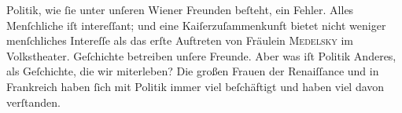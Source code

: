                Politik, wie ſie unter unſeren Wiener Freunden
               beſteht, ein Fehler. Alles Menſchliche iſt intereſſant; und \strikeout{\textcolor{gray}{poli}} eine Kaiſerzuſammenkunft bietet nicht weniger
               menſchliches Intereſſe als das erſte Auftreten von Fräulein \textsc{Medelsky} im Volkstheater. Geſchichte betreiben
               unſere Freunde. Aber was iſt Politik Anderes, als Geſchichte, die wir miterleben? Die
               großen Frauen der Renaiſſance und in Frankreich
               haben ſich mit Politik immer viel beſchäftigt und haben viel davon  verſtanden.\pend
           

